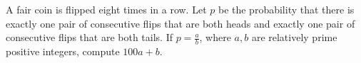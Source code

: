 A fair coin is flipped eight times in a row. Let $p$ be the probability that there is exactly one pair of consecutive flips that are both heads and exactly one pair of consecutive flips that are both tails. If $p = \frac{a}{b}$, where $a, b$ are relatively prime positive integers, compute $100a + b$.

